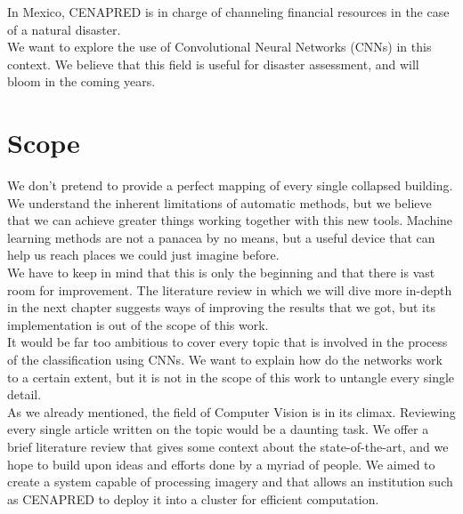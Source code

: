 In Mexico, CENAPRED is in charge of channeling financial resources in the case of a natural disaster.\\

We want to explore the use of Convolutional Neural Networks (CNNs) in this context. We believe that this field is useful for disaster assessment, and will bloom in the coming years.\\

\section{Scope}

We don't pretend to provide a perfect mapping of every single collapsed building. We understand the inherent limitations of automatic methods, but we believe that we can achieve greater things working together with this new tools. Machine learning methods are not a panacea by no means, but a useful device that can help us reach places we could just imagine before.\\

We have to keep in mind that this is only the beginning and that there is vast room for improvement. The literature review in which we will dive more in-depth in the next chapter suggests ways of improving the results that we got, but its implementation is out of the scope of this work.\\

It would be far too ambitious to cover every topic that is involved in the process of the classification using CNNs. We want to explain how do the networks work to a certain extent, but it is not in the scope of this work to untangle every single detail.\\

As we already mentioned, the field of Computer Vision is in its climax. Reviewing every single article written on the topic would be a daunting task. We offer a brief literature review that gives some context about the state-of-the-art, and we hope to build upon ideas and efforts done by a myriad of people. We aimed to create a system capable of processing imagery and that allows an institution such as CENAPRED to deploy it into a cluster for efficient computation.\\